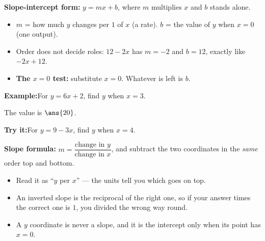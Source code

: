 \documentclass[12pt]{article}
\begin{document}


\begin{formulabox}
\textbf{Slope-intercept form:} $y = mx + b$, where $m$ multiplies $x$ and $b$
stands alone.
\begin{itemize}[leftmargin=0.8cm, itemsep=1pt, topsep=2pt]
  \item $m$ = how much $y$ changes per $1$ of $x$ (a rate).
        $b$ = the value of $y$ when $x = 0$ (one output).
  \item Order does not decide roles: $12 - 2x$ has $m = -2$ and $b = 12$, exactly
        like $-2x + 12$.
  \item \textbf{The $x = 0$ test:} substitute $x = 0$. Whatever is left is $b$.
\end{itemize}
\end{formulabox}

\begin{examplebox}
\textbf{Example:}\quad For $y = 6x + 2$, find $y$ when $x = 3$.

The value is $\ans{20}$.
\end{examplebox}

\begin{tryitbox}
\textbf{Try it:}\quad For $y = 9 - 3x$, find $y$ when $x = 4$.\\[2pt]
\end{tryitbox}


\begin{formulabox}
\textbf{Slope formula:} $m = \dfrac{\text{change in } y}{\text{change in } x}$,
and subtract the two coordinates in the \emph{same} order top and bottom.
\begin{itemize}[leftmargin=0.8cm, itemsep=1pt, topsep=2pt]
  \item Read it as ``$y$ per $x$'' --- the units tell you which goes on top.
  \item An inverted slope is the reciprocal of the right one, so if your answer
        times the correct one is $1$, you divided the wrong way round.
  \item A $y$ coordinate is never a slope, and it is the intercept only when its
        point has $x = 0$.
\end{itemize}
\end{formulabox}
\end{document}
